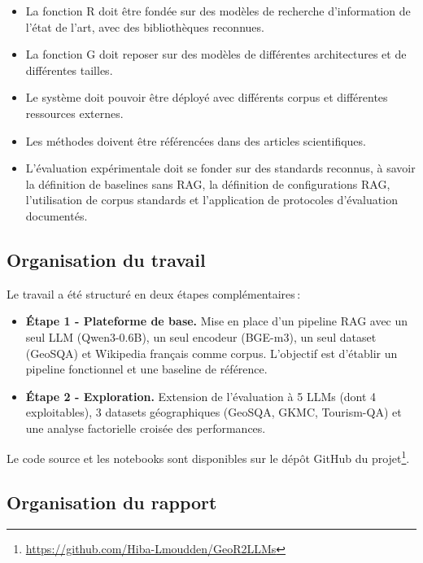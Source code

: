\documentclass[12pt,a4paper]{article}
\begin{document}
\begin{itemize}[leftmargin=*]
  \item La fonction R doit \^etre fond\'ee sur des mod\`eles de recherche d'information de l'\'etat de l'art, avec des biblioth\`eques reconnues.
  \item La fonction G doit reposer sur des mod\`eles de diff\'erentes architectures et de diff\'erentes tailles.
  \item Le syst\`eme doit pouvoir \^etre d\'eploy\'e avec diff\'erents corpus et diff\'erentes ressources externes.
  \item Les m\'ethodes doivent \^etre r\'ef\'erenc\'ees dans des articles scientifiques.
  \item L'\'evaluation exp\'erimentale doit se fonder sur des standards reconnus, \`a savoir la d\'efinition de baselines sans RAG, la d\'efinition de configurations RAG, l'utilisation de corpus standards et l'application de protocoles d'\'evaluation document\'es.
\end{itemize}

\subsection{Organisation du travail}

Le travail a \'et\'e structur\'e en deux \'etapes compl\'ementaires\,:

\begin{itemize}[leftmargin=*]
  \item \textbf{\'Etape 1 - Plateforme de base.} Mise en place d'un pipeline RAG avec un seul LLM (Qwen3-0.6B), un seul encodeur (BGE-m3), un seul dataset (GeoSQA) et Wikipedia fran\c{c}ais comme corpus. L'objectif est d'\'etablir un pipeline fonctionnel et une baseline de r\'ef\'erence.
  \item \textbf{\'Etape 2 - Exploration.} Extension de l'\'evaluation \`a 5 LLMs (dont 4 exploitables), 3 datasets g\'eographiques (GeoSQA, GKMC, Tourism-QA) et une analyse factorielle crois\'ee des performances.
\end{itemize}

Le code source et les notebooks sont disponibles sur le d\'ep\^ot GitHub du projet\footnote{\url{https://github.com/Hiba-Lmoudden/GeoR2LLMs}}.

\subsection{Organisation du rapport}
\end{document}
